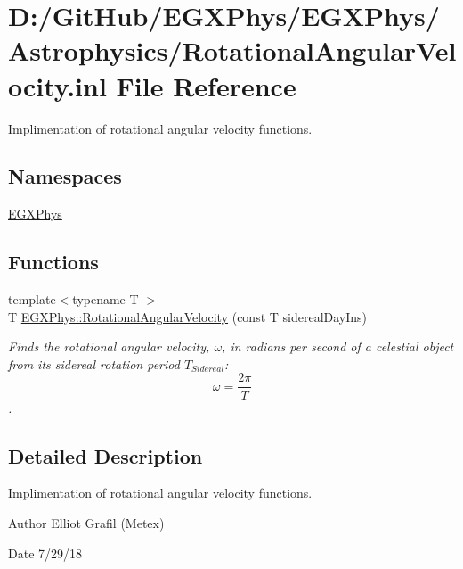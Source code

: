 \hypertarget{_rotational_angular_velocity_8inl}{}\section{D\+:/\+Git\+Hub/\+E\+G\+X\+Phys/\+E\+G\+X\+Phys/\+Astrophysics/\+Rotational\+Angular\+Velocity.inl File Reference}
\label{_rotational_angular_velocity_8inl}


Implimentation of rotational angular velocity functions.  


\subsection*{Namespaces}
\begin{DoxyCompactItemize}
\item 
 \mbox{\hyperlink{namespace_e_g_x_phys}{E\+G\+X\+Phys}}
\end{DoxyCompactItemize}
\subsection*{Functions}
\begin{DoxyCompactItemize}
\item 
{\footnotesize template$<$typename T $>$ }\\T \mbox{\hyperlink{group___e_g_x_phys-_astrophysics-_rotational_angular_velocity_gad8966c9d42ff617677152fa014f7d1db}{E\+G\+X\+Phys\+::\+Rotational\+Angular\+Velocity}} (const T sidereal\+Day\+Ins)
\begin{DoxyCompactList}\small\item\em Finds the rotational angular velocity, $\omega$, in radians per second of a celestial object from its sidereal rotation period $T_{Sidereal}$\+: \[ \omega = \dfrac{2\pi}{T} \]. \end{DoxyCompactList}\end{DoxyCompactItemize}


\subsection{Detailed Description}
Implimentation of rotational angular velocity functions. 

\begin{DoxyAuthor}{Author}
Elliot Grafil (Metex) 
\end{DoxyAuthor}
\begin{DoxyDate}{Date}
7/29/18 
\end{DoxyDate}
